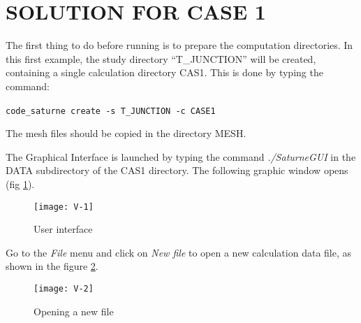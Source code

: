 %
%
%
%
%
%
%
\section{SOLUTION FOR CASE 1}
The first thing to do before running \CS is to prepare the computation
directories. In this first example, the study directory ``T\_JUNCTION'' will be
created, containing a single calculation directory CAS1. This is done by typing
the command:
\begin{center}
\texttt{code\_saturne create -s T\_JUNCTION -c CASE1}\
\end{center}
The mesh files should be copied in the directory MESH.

The \CS Graphical Interface is launched by typing the command
{\itshape ./SaturneGUI} in the DATA subdirectory of the CAS1 directory.
The following graphic window opens (fig \ref{fig1_e1}).

\begin{figure}[ht]
\begin{center}
\texttt{[image: V-1]}
\caption{User interface}
\label{fig1_e1}
\end{center}
\end{figure}


\clearpage
Go to the {\itshape File} menu and click on {\itshape New file} to open a new
calculation data file, as shown in the figure
\ref{fig2_e1}.

\begin{figure}[ht]
\begin{center}
\texttt{[image: V-2]}
\caption{Opening a new file}
\label{fig2_e1}
\end{center}
\end{figure}


